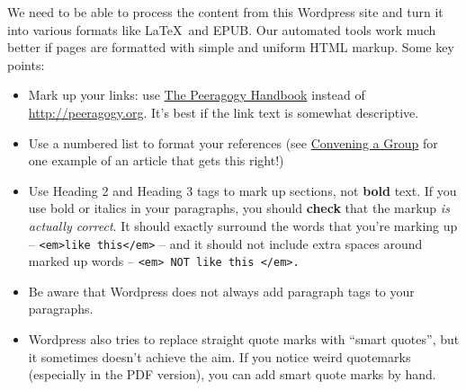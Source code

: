 We need to be able to process the content from this Wordpress site and
turn it into various formats like \LaTeX\ and EPUB. Our automated tools
work much better if pages are formatted with simple and uniform HTML
markup. Some key points:

\begin{itemize}
\item
  Mark up your links: use \href{http://peeragogy.org}{The Peeragogy
  Handbook} instead of
  \href{http://peeragogy.org}{http://peeragogy.org}. It's best if the
  link text is somewhat descriptive.
\item
  Use a numbered list to format your references (see
  \href{http://peeragogy.org/convening-a-group/}{Convening a Group} for
  one example of an article that gets this right!)
\item
  Use Heading 2 and Heading 3 tags to mark up sections, not
  \textbf{bold} text. If you use bold or italics in your paragraphs, you
  should \textbf{check} that the markup \emph{is actually correct}. It
  should exactly surround the words that you're marking up --
  \texttt{\textless{}em\textgreater{}like this\textless{}/em\textgreater{}}
  -- and it should not include extra spaces around marked up words --
  \texttt{\textless{}em\textgreater{} NOT like this \textless{}/em\textgreater{}.}
\item
  Be aware that Wordpress does not always add paragraph tags to your
  paragraphs.
\item
  Wordpress also tries to replace straight quote marks with ``smart
  quotes'', but it sometimes doesn't achieve the aim. If you notice
  weird quotemarks (especially in the PDF version), you can add smart
  quote marks by hand.
\end{itemize}
